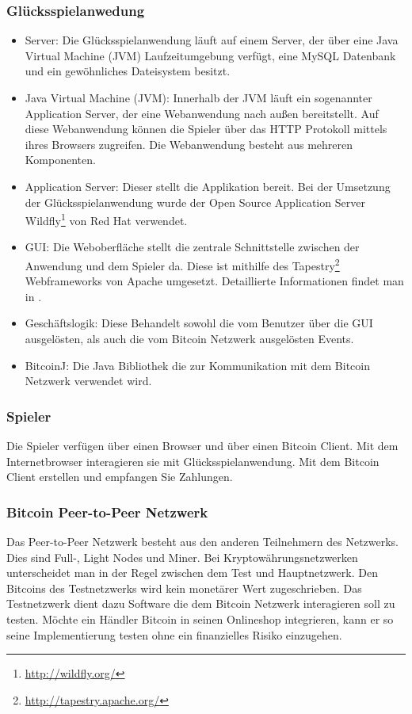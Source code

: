 \subsubsection{Glücksspielanwedung}
\begin{itemize}
\item Server: Die Glücksspielanwendung läuft auf einem Server, der über eine Java Virtual Machine (JVM) Laufzeitumgebung verfügt, eine MySQL Datenbank und ein gewöhnliches Dateisystem besitzt.
\item Java Virtual Machine (JVM): Innerhalb der JVM läuft ein sogenannter Application Server, der eine Webanwendung nach außen bereitstellt. Auf diese Webanwendung können die Spieler über das HTTP Protokoll mittels ihres Browsers zugreifen. Die Webanwendung besteht aus mehreren Komponenten.
\item Application Server: Dieser stellt die Applikation bereit. Bei der Umsetzung der Glücksspielanwendung wurde der Open Source Application Server Wildfly\footnote{\url{http://wildfly.org/}} von Red Hat verwendet.
\item GUI: Die Weboberfläche stellt die zentrale Schnittstelle zwischen der Anwendung und dem Spieler da. Diese ist mithilfe des Tapestry\footnote{\url{http://tapestry.apache.org/}} Webframeworks von Apache umgesetzt. Detaillierte Informationen findet man in \citep{tapestry}.
\item Geschäftslogik: Diese Behandelt sowohl die vom Benutzer über die GUI ausgelösten, als auch die vom Bitcoin Netzwerk ausgelösten Events.
\item BitcoinJ: Die Java Bibliothek die zur Kommunikation mit dem Bitcoin Netzwerk verwendet wird.
\end{itemize}

\subsubsection{Spieler}
Die Spieler verfügen über einen Browser und über einen Bitcoin Client.
Mit dem Internetbrowser interagieren sie mit Glücksspielanwendung. Mit dem Bitcoin Client erstellen und empfangen Sie Zahlungen.
\subsubsection{Bitcoin Peer-to-Peer Netzwerk}
Das Peer-to-Peer Netzwerk besteht aus den anderen Teilnehmern des Netzwerks. Dies sind Full-, Light Nodes und Miner. Bei Kryptowährungsnetzwerken unterscheidet man in der Regel zwischen dem Test und Hauptnetzwerk. Den Bitcoins des Testnetzwerks wird kein monetärer Wert zugeschrieben. Das Testnetzwerk dient dazu Software die dem Bitcoin Netzwerk interagieren soll zu testen. Möchte ein Händler Bitcoin in seinen Onlineshop integrieren, kann er so seine Implementierung testen ohne ein finanzielles Risiko einzugehen. 

